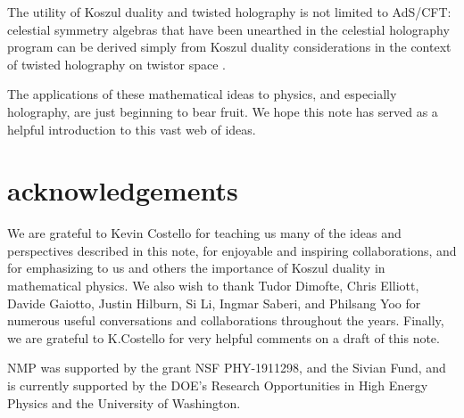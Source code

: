 \documentclass[11pt]{amsart}
\begin{document}
\begin{itemize}
The utility of Koszul duality and twisted holography is not limited to AdS/CFT: celestial symmetry algebras that have been unearthed in the celestial holography program can be derived simply from Koszul duality considerations in the context of twisted holography on twistor space \cite{CP2}. 
\end{itemize}

The applications of these mathematical ideas to physics, and especially holography, are just beginning to bear fruit. We hope this note has served as a helpful introduction to this vast web of ideas. 


\section{acknowledgements} We are grateful to Kevin Costello for teaching us many of the ideas and perspectives described in this note, for enjoyable and inspiring collaborations, and for emphasizing to us and others the importance of Koszul duality in mathematical physics. We also wish to thank Tudor Dimofte, Chris Elliott, Davide Gaiotto, Justin Hilburn, Si Li, Ingmar Saberi, and Philsang Yoo for numerous useful conversations and collaborations throughout the years. Finally, we are grateful to K.Costello for very helpful comments on a draft of this note. 

NMP was supported by the grant NSF PHY-1911298, and the Sivian Fund, and is currently supported by the DOE's Research Opportunities in High Energy Physics and the University of Washington. 



\printbibliography
\end{document}
